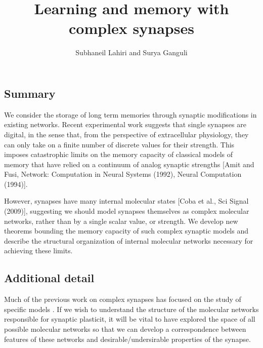 \documentclass[12pt]{article}
\title{Learning and memory with complex synapses}
\author{Subhaneil Lahiri and Surya Ganguli}
\date{}
\begin{document}
\maketitle



\subsection*{Summary}

We consider the storage of long term memories through synaptic modifications in existing networks.
Recent experimental work suggests that single synapses are digital, in the sense that, from the perspective of extracellular physiology, they can only take on a finite number of discrete values for their strength.
This imposes catastrophic limits on the memory capacity of classical models of memory that have relied on a continuum of analog synaptic strengths [Amit and Fusi, Network: Computation in Neural Systems (1992), Neural Computation (1994)]\nocite{amit1992constraints,amit1994learning}.

However, synapses have many internal molecular states [Coba et al., Sci Signal (2009)]\nocite{Coba2009phosphorylation}, suggesting we should model synapses themselves as complex molecular networks, rather than by a single scalar value, or strength.
We develop new theorems bounding the memory capacity of such complex synaptic models and describe the structural organization of internal molecular networks necessary for achieving these limits.

\subsection*{Additional detail}

Much of the previous work on complex synapses has focused on the study of specific models \cite{amit1994learning,Fusi2005cascade,Fusi2007multistate}.
If we wish to understand the structure of the molecular networks responsible for synaptic plasticit, it will be vital to have explored the space of all possible molecular networks so that we can develop a correspondence between features of these networks and desirable/undersirable properties of the synapse.
\end{document}
